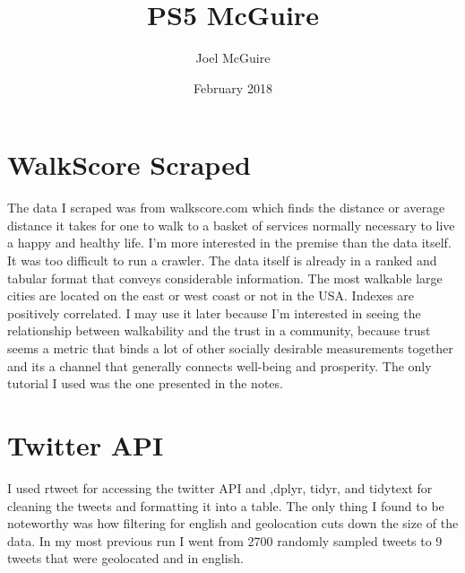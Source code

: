 \documentclass{article}
\title{PS5 McGuire}
\author{Joel McGuire}
\date{February 2018}
\begin{document}
\maketitle

\section{WalkScore Scraped}
The data I scraped was from walkscore.com which finds the distance or average distance it takes for one to walk to a basket of services normally necessary to live a happy and healthy life. I'm more interested in the premise than the data itself. It was too difficult to run a crawler. The data itself is already in a ranked and tabular format that conveys considerable information. The most walkable large cities are located on the east or west coast or not in the USA. Indexes are positively correlated. I may use it later because I'm interested in seeing the relationship between walkability and the trust in a community, because trust seems a metric that binds a lot of other socially desirable measurements together and its a channel that generally connects well-being and prosperity. The only tutorial I used was the one presented in the notes. 

\section{Twitter API}
I used rtweet for accessing the twitter API and ,dplyr, tidyr, and tidytext for cleaning the tweets and formatting it into a table. The only thing I found to be noteworthy was how filtering for english and geolocation cuts down the size of the data. In my most previous run I went from 2700 randomly sampled tweets to 9 tweets that were geolocated and in english.  
\end{document}
